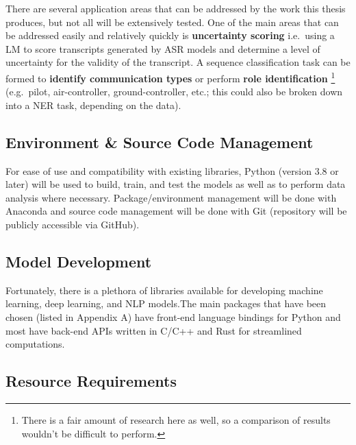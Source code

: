 \documentclass[10pt]{article}
\begin{document}
        There are several application areas that can be addressed by the work this thesis produces, but not all will be extensively
        tested. One of the main areas that can be addressed easily and relatively quickly is \textbf{uncertainty scoring} i.e.~using a
        LM to score transcripts generated by ASR models and determine a level of uncertainty for the validity of the transcript.
        A sequence classification task can be formed to \textbf{identify communication types} or perform \textbf{role identification}
        \footnote{There is a fair amount of research here as well, so a comparison of results wouldn't be difficult to perform.}
        (e.g.~pilot, air-controller, ground-controller, etc.; this could also be broken down into a NER task, depending on the data).

        \subsection{Environment \& Source Code Management}
        For ease of use and compatibility with existing libraries, Python (version 3.8 or later) will be used to build, train,
        and test the models as well as to perform data analysis where necessary. Package/environment management will be done with
        Anaconda and source code management will be done with Git (repository will be publicly accessible via GitHub).

        \subsection{Model Development}
        Fortunately, there is a plethora of libraries available for developing machine learning, deep learning, and NLP models.The
        main packages that have been chosen (listed in Appendix A) have front-end language bindings for Python and most have
        back-end APIs written in C/C++ and Rust for streamlined computations.

        \subsection{Resource Requirements}
\end{document}
